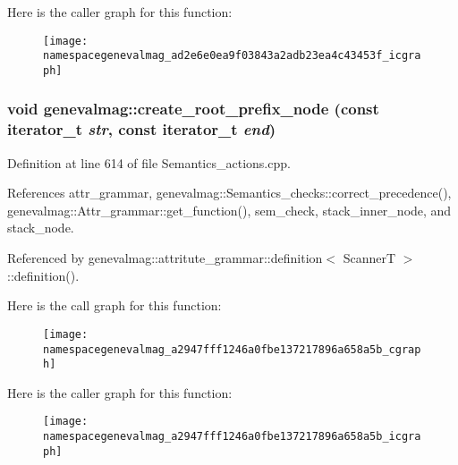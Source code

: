Here is the caller graph for this function:\nopagebreak
\begin{figure}[H]
\begin{center}
\leavevmode
\texttt{[image: namespacegenevalmag\_ad2e6e0ea9f03843a2adb23ea4c43453f\_icgraph]}
\end{center}
\end{figure}


\hypertarget{namespacegenevalmag_a2947fff1246a0fbe137217896a658a5b}{
\subsubsection[{create\_\-root\_\-prefix\_\-node}]{\setlength{\rightskip}{0pt plus 5cm}void genevalmag::create\_\-root\_\-prefix\_\-node (const iterator\_\-t {\em str}, \/  const iterator\_\-t {\em end})}}
\label{namespacegenevalmag_a2947fff1246a0fbe137217896a658a5b}


Definition at line 614 of file Semantics\_\-actions.cpp.



References attr\_\-grammar, genevalmag::Semantics\_\-checks::correct\_\-precedence(), genevalmag::Attr\_\-grammar::get\_\-function(), sem\_\-check, stack\_\-inner\_\-node, and stack\_\-node.



Referenced by genevalmag::attritute\_\-grammar::definition$<$ ScannerT $>$::definition().



Here is the call graph for this function:\nopagebreak
\begin{figure}[H]
\begin{center}
\leavevmode
\texttt{[image: namespacegenevalmag\_a2947fff1246a0fbe137217896a658a5b\_cgraph]}
\end{center}
\end{figure}




Here is the caller graph for this function:\nopagebreak
\begin{figure}[H]
\begin{center}
\leavevmode
\texttt{[image: namespacegenevalmag\_a2947fff1246a0fbe137217896a658a5b\_icgraph]}
\end{center}
\end{figure}



